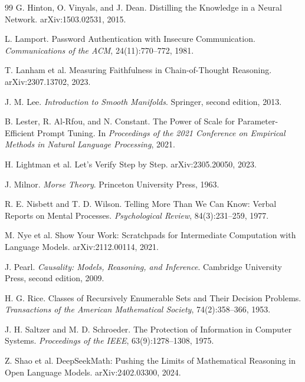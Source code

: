 \documentclass[11pt,twoside,openright]{book}
\theoremstyle{plain}
\theoremstyle{definition}
\theoremstyle{remark}
\begin{document}
\begin{thebibliography}{99}
G. Hinton, O. Vinyals, and J. Dean.
\newblock Distilling the Knowledge in a Neural Network.
\newblock arXiv:1503.02531, 2015.

L. Lamport.
\newblock Password Authentication with Insecure Communication.
\newblock \emph{Communications of the ACM}, 24(11):770--772, 1981.

T. Lanham et al.
\newblock Measuring Faithfulness in Chain-of-Thought Reasoning.
\newblock arXiv:2307.13702, 2023.

J. M. Lee.
\newblock \emph{Introduction to Smooth Manifolds}.
\newblock Springer, second edition, 2013.

B. Lester, R. Al-Rfou, and N. Constant.
\newblock The Power of Scale for Parameter-Efficient Prompt Tuning.
\newblock In \emph{Proceedings of the 2021 Conference on Empirical Methods in Natural Language Processing}, 2021.

H. Lightman et al.
\newblock Let's Verify Step by Step.
\newblock arXiv:2305.20050, 2023.

J. Milnor.
\newblock \emph{Morse Theory}.
\newblock Princeton University Press, 1963.

R. E. Nisbett and T. D. Wilson.
\newblock Telling More Than We Can Know: Verbal Reports on Mental Processes.
\newblock \emph{Psychological Review}, 84(3):231--259, 1977.

M. Nye et al.
\newblock Show Your Work: Scratchpads for Intermediate Computation with Language Models.
\newblock arXiv:2112.00114, 2021.

J. Pearl.
\newblock \emph{Causality: Models, Reasoning, and Inference}.
\newblock Cambridge University Press, second edition, 2009.

H. G. Rice.
\newblock Classes of Recursively Enumerable Sets and Their Decision Problems.
\newblock \emph{Transactions of the American Mathematical Society}, 74(2):358--366, 1953.

J. H. Saltzer and M. D. Schroeder.
\newblock The Protection of Information in Computer Systems.
\newblock \emph{Proceedings of the IEEE}, 63(9):1278--1308, 1975.

Z. Shao et al.
\newblock DeepSeekMath: Pushing the Limits of Mathematical Reasoning in Open Language Models.
\newblock arXiv:2402.03300, 2024.


\end{thebibliography}
\end{document}
